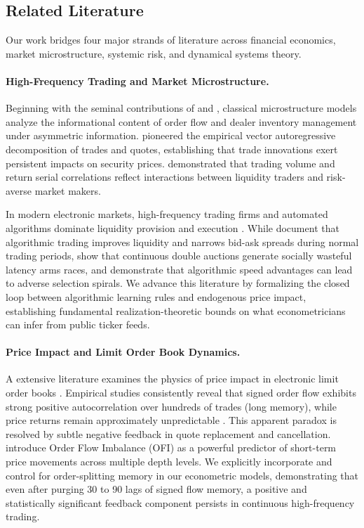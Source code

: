\documentclass[12pt]{article}
\theoremstyle{definition}
\theoremstyle{remark}
\begin{document}
\subsection{Related Literature}
Our work bridges four major strands of literature across financial economics, market microstructure, systemic risk, and dynamical systems theory.

\paragraph{High-Frequency Trading and Market Microstructure.}
Beginning with the seminal contributions of \citet{kyle1985continuous} and \citet{glosten1985bid}, classical microstructure models analyze the informational content of order flow and dealer inventory management under asymmetric information. \citet{hasbrouck1991} pioneered the empirical vector autoregressive decomposition of trades and quotes, establishing that trade innovations exert persistent impacts on security prices. \citet{campbell1993trading} demonstrated that trading volume and return serial correlations reflect interactions between liquidity traders and risk-averse market makers.

In modern electronic markets, high-frequency trading firms and automated algorithms dominate liquidity provision and execution \citep{menkveld2013,budish2015,biais2015}. While \citet{hendershott2011does} document that algorithmic trading improves liquidity and narrows bid-ask spreads during normal trading periods, \citet{budish2015} show that continuous double auctions generate socially wasteful latency arms races, and \citet{biais2015} demonstrate that algorithmic speed advantages can lead to adverse selection spirals. We advance this literature by formalizing the closed loop between algorithmic learning rules and endogenous price impact, establishing fundamental realization-theoretic bounds on what econometricians can infer from public ticker feeds.

\paragraph{Price Impact and Limit Order Book Dynamics.}
A extensive literature examines the physics of price impact in electronic limit order books \citep{almgren2000,bouchaud2004fluctuations,cont2010stochastic,cont2014}. Empirical studies consistently reveal that signed order flow exhibits strong positive autocorrelation over hundreds of trades (long memory), while price returns remain approximately unpredictable \citep{bouchaud2004fluctuations,cont2014}. This apparent paradox is resolved by subtle negative feedback in quote replacement and cancellation. \citet{cont2014} introduce Order Flow Imbalance (OFI) as a powerful predictor of short-term price movements across multiple depth levels. We explicitly incorporate and control for order-splitting memory in our econometric models, demonstrating that even after purging 30 to 90 lags of signed flow memory, a positive and statistically significant feedback component persists in continuous high-frequency trading.
\end{document}
